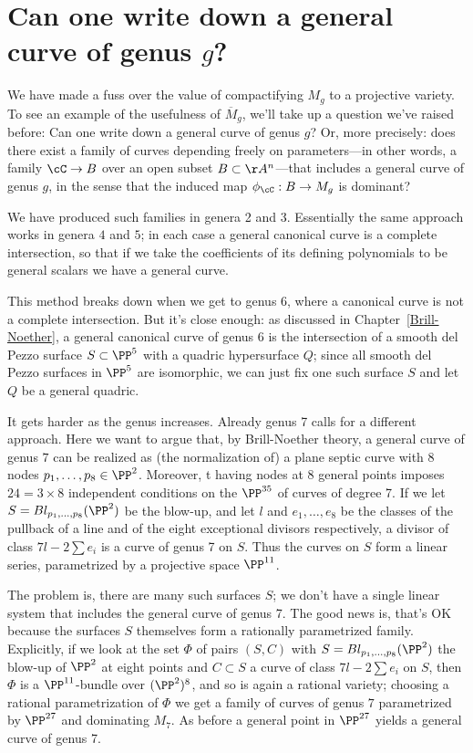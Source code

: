 \section{Can one write down a general curve of genus $g$?}\label{mgunirational}

We have made a fuss over the value of compactifying $M_g$ to a projective variety. To see an example of the usefulness of $\overline M_g$, we'll take up a question we've raised before: Can one write down a general curve of genus $g$?
Or, more precisely: does there exist  a family of curves depending freely on parameters---in other words, a family $\cC \to B$ over an open subset $B \subset \AA^n$---that includes a general curve of genus $g$, in the sense that the induced map $\phi_\cC : B \to M_g$ is dominant? 	

We have produced such  families in genera 2 and 3. Essentially
the same approach works in genera $4$ and $5$; in each case a general canonical curve is a complete intersection, so that if we take the coefficients of its defining polynomials to be general scalars we have a general curve.

This method breaks down when we get to genus 6, where a canonical curve is not a complete intersection. But it's close enough: as discussed in Chapter~\ref{Brill-Noether}, a general canonical curve of genus 6 is the intersection of a smooth del Pezzo surface $S \subset \PP^5$ with a quadric hypersurface $Q$; since all smooth del Pezzo surfaces in $\PP^5$ are isomorphic, we can just fix one such surface $S$ and let $Q$ be a general quadric.

It gets harder as the genus increases. Already genus 7 calls for a different approach. Here we want to argue that, by Brill-Noether theory, a general curve of genus $7$ can be realized as (the normalization of) a plane septic curve with 8 nodes $p_1,\dots,p_8 \in \PP^2$. Moreover, t having nodes at 8 general points imposes $24= 3\times 8$ independent conditions on the $\PP^{35}$ of curves of degree 7. 
If we let $S = Bl_{p_1,\dots,p_8}(\PP^2)$ be the blow-up, and let $l$ and $e_1,\dots,e_8$ be the classes of the pullback of a line and of the eight exceptional divisors respectively, a divisor of class $7l - 2 \sum e_i$ is a curve of genus 7 on $S$. Thus the curves on $S$ form a linear series, parametrized by a projective space $\PP^{11}$.

The problem is, there are many such surfaces $S$; we don't have a single linear system that includes the general curve of genus 7. The good news is, that's OK because the surfaces $S$ themselves form a rationally parametrized family. Explicitly, if we look at the set $\Phi$ of pairs $(S, C)$ with $S = Bl_{p_1,\dots,p_8}(\PP^2)$  the blow-up of $\PP^2$ at eight points and $C \subset S$ a curve of class $7l - 2 \sum e_i$ on $S$, then $\Phi$ is a $\PP^{11}$-bundle over $(\PP^2)^8$, and so is again a rational variety; choosing a rational parametrization of $\Phi$ we get a family of curves of genus $7$ parametrized by $\PP^{27}$ and dominating $M_7$. As before a general point in $\PP^{27}$ yields a general curve of genus 7.

